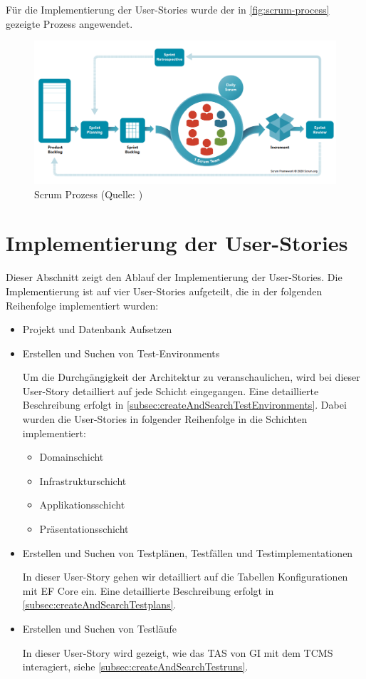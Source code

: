 \documentclass[a4paper, fontsize=11pt, parskip=half, twoside, headings=openright]{scrreprt}
\begin{document}
	Für die Implementierung der User-Stories wurde der in \autoref{fig:scrum-process} gezeigte Prozess angewendet.
		
	\begin{figure}[ht]
		\centering
		\includegraphics[scale=0.35]{assets/scrum-process.png}
		\caption{Scrum Prozess (Quelle: \textcite{noauthor_home_nodate})}
		\label{fig:scrum-process}
	\end{figure}
	
	
	\section{Implementierung der User-Stories}
	Dieser Abschnitt zeigt den Ablauf der Implementierung der User-Stories.
	Die Implementierung ist auf vier User-Stories aufgeteilt, die in der folgenden Reihenfolge implementiert wurden:
	
	\begin{itemize}
		\item Projekt und Datenbank Aufsetzen
		\item Erstellen und Suchen von Test-Environments
		
		Um die Durchgängigkeit der Architektur zu veranschaulichen, wird bei dieser User-Story detailliert auf jede Schicht eingegangen.
		Eine detaillierte Beschreibung erfolgt in \autoref{subsec:createAndSearchTestEnvironments}.
		Dabei wurden die User-Stories in folgender Reihenfolge in die Schichten implementiert:
		
		\begin{itemize}
			\setlength\itemsep{-0.5em}
			\item Domainschicht
			\item Infrastrukturschicht
			\item Applikationsschicht
			\item Präsentationsschicht
		\end{itemize}
	
		\item Erstellen und Suchen von Testplänen, Testfällen und Testimplementationen
		
		In dieser User-Story gehen wir detailliert auf die Tabellen Konfigurationen mit \ac{EF} Core ein.
		Eine detaillierte Beschreibung erfolgt in \autoref{subsec:createAndSearchTestplans}.
		
		\item Erstellen und Suchen von Testläufe
		
		In dieser User-Story wird gezeigt, wie das \ac{TAS} von \ac{GI} mit dem \ac{TCMS} interagiert, siehe \autoref{subsec:createAndSearchTestruns}.
	\end{itemize}
\end{document}
